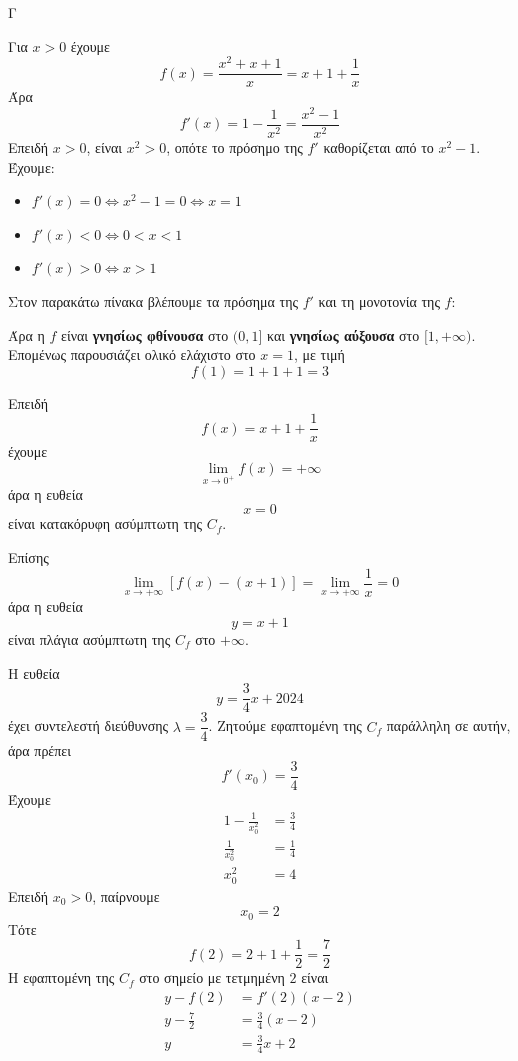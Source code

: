 \begin{thema}{Γ}
\begin{erwthma}
\item Για $x>0$ έχουμε
\[f(x)=\frac{x^2+x+1}{x}=x+1+\frac{1}{x}\]
Άρα
\[f'(x)=1-\frac{1}{x^2}=\frac{x^2-1}{x^2}\]
Επειδή $x>0$, είναι $x^2>0$, οπότε το πρόσημο της $f'$ καθορίζεται από το $x^2-1$.
Έχουμε:
\begin{itemize}
\item $f'(x)=0\Leftrightarrow x^2-1=0\Leftrightarrow x=1$
\item $f'(x)<0\Leftrightarrow 0<x<1$
\item $f'(x)>0\Leftrightarrow x>1$
\end{itemize}
Στον παρακάτω πίνακα βλέπουμε τα πρόσημα της $f'$ και τη μονοτονία της $f$:
\begin{center}
\end{center}
Άρα η $f$ είναι \textbf{γνησίως φθίνουσα} στο $(0,1]$ και \textbf{γνησίως αύξουσα} στο $[1,+\infty)$.
Επομένως παρουσιάζει ολικό ελάχιστο στο $x=1$, με τιμή
\[f(1)=1+1+1=3\]

\item Επειδή
\[f(x)=x+1+\frac{1}{x}\]
έχουμε
\[\lim\limits_{x\to 0^+}f(x)=+\infty\]
άρα η ευθεία
\[x=0\]
είναι κατακόρυφη ασύμπτωτη της $C_f$.

Επίσης
\[\lim\limits_{x\to+\infty}\left[f(x)-(x+1)\right]=\lim\limits_{x\to+\infty}\frac{1}{x}=0\]
άρα η ευθεία
\[y=x+1\]
είναι πλάγια ασύμπτωτη της $C_f$ στο $+\infty$.

\item Η ευθεία
\[y=\frac{3}{4}x+2024\]
έχει συντελεστή διεύθυνσης $\lambda=\dfrac{3}{4}$.
Ζητούμε εφαπτομένη της $C_f$ παράλληλη σε αυτήν, άρα πρέπει
\[f'(x_0)=\frac{3}{4}\]
Έχουμε
\begin{align*}
1-\frac{1}{x_0^2}&=\frac{3}{4}\\
\frac{1}{x_0^2}&=\frac{1}{4}\\
x_0^2&=4
\end{align*}
Επειδή $x_0>0$, παίρνουμε
\[x_0=2\]
Τότε
\[f(2)=2+1+\frac{1}{2}=\frac{7}{2}\]
Η εφαπτομένη της $C_f$ στο σημείο με τετμημένη $2$ είναι
\begin{align*}
y-f(2)&=f'(2)(x-2)\\
y-\frac{7}{2}&=\frac{3}{4}(x-2)\\
y&=\frac{3}{4}x+2
\end{align*}


\end{erwthma}
\end{thema}

